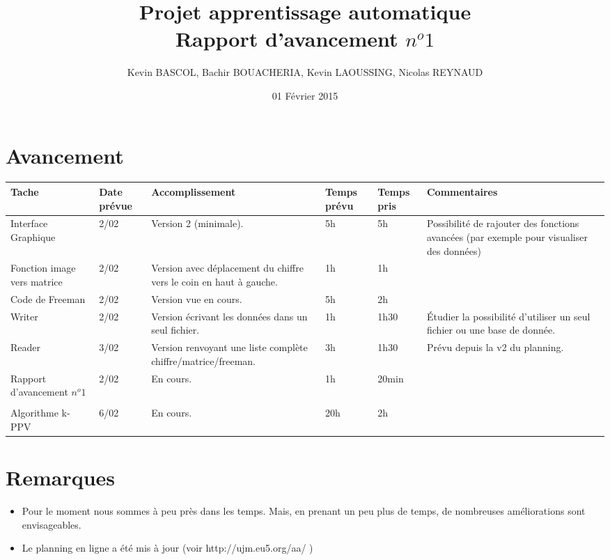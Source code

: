 \documentclass[10pt,a4paper, landscape]{report}
\author{Kevin BASCOL, Bachir BOUACHERIA, Kevin LAOUSSING, Nicolas REYNAUD}
\title{Projet apprentissage automatique\\Rapport d'avancement $n^o 1$}
\date{\vfill 01 Février 2015}
\begin{document}
\maketitle

\section*{Avancement}
\begin{center}
	\bgroup
	\def\arraystretch{1.5}
	\begin{tabular}{|p{7cm}|p{1cm}|p{7cm}|p{2cm}|p{2cm}|p{7cm}|}
		\hline
		\rowcolor{gris}Tache & Date prévue & Accomplissement & Temps prévu & Temps pris & Commentaires\\
		\hline
		Interface Graphique & 2/02 & Version 2 (minimale). & 5h & 5h & Possibilité de rajouter des fonctions avancées (par exemple pour visualiser des données)\\
		\hline
		Fonction image vers matrice & 2/02 & Version avec déplacement du chiffre vers le coin en haut à gauche. & 1h & 1h & \\
		\hline
		Code de Freeman & 2/02 & Version vue en cours. & 5h & 2h & \\
		\hline
		Writer & 2/02 & Version écrivant les données dans un seul fichier. & 1h & 1h30 & Étudier la possibilité d'utiliser un seul fichier ou une base de donnée.\\
		\hline
		Reader & 3/02 & Version renvoyant une liste complète chiffre/matrice/freeman. & 3h & 1h30 & Prévu depuis la v2 du planning. \\
		\hline
		Rapport d'avancement $n^o 1$ & 2/02 & En cours. & 1h & 20min & \\
		\hline
		\rowcolor{gris} & & & & & \\
		Algorithme k-PPV & 6/02 & En cours. & 20h & 2h & \\
		\hline
	\end{tabular}
	\egroup
\end{center}

\section*{Remarques}
\begin{itemize}
\item Pour le moment nous sommes à peu près dans les temps. Mais, en prenant un peu plus de temps, de nombreuses améliorations sont envisageables.
\item Le planning en ligne a été mis à jour (voir http://ujm.eu5.org/aa/ )
\end{itemize}
\end{document}
